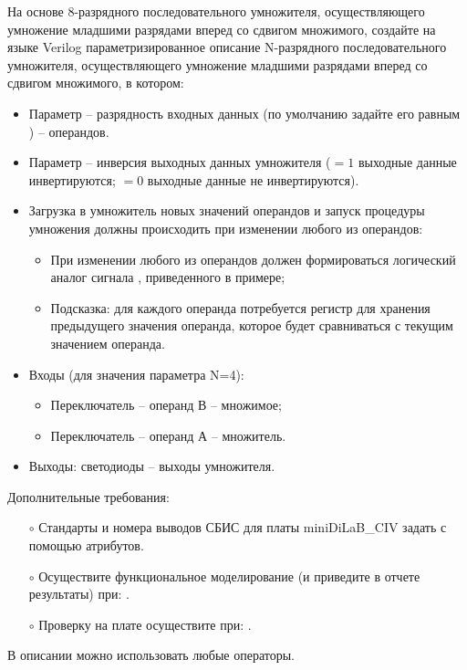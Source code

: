 На основе 8-разрядного последовательного умножителя, осуществляющего умножение младшими разрядами вперед со сдвигом множимого, создайте на языке Verilog параметризированное описание N-разрядного последовательного умножителя, осуществляющего умножение младшими разрядами вперед со сдвигом множимого, в котором:
\begin{itemize}
	\item Параметр  -- разрядность входных данных (по умолчанию задайте его равным ) -- операндов.
	\item Параметр  --  инверсия выходных данных умножителя ($=1$ выходные данные инвертируются; $=0$ выходные данные не инвертируются).
	\item Загрузка в умножитель новых значений операндов и запуск процедуры умножения должны происходить при изменении любого из операндов:
		\begin{itemize}
			\item При изменении любого из операндов должен формироваться логический аналог сигнала , приведенного в примере;
			\item Подсказка: для каждого операнда потребуется регистр для хранения предыдущего значения операнда, которое будет сравниваться с текущим значением операнда.		
		\end{itemize}
	\item Входы (для значения параметра N=4):
		\begin{itemize}
			\item Переключатель  -- операнд В -- множимое;
			\item Переключатель  -- операнд А -- множитель.
		\end{itemize}
	\item Выходы: светодиоды  -- выходы умножителя.
\end{itemize}

Дополнительные требования:
\begin{itemize}
	\item[$\circ$] Стандарты и номера выводов СБИС для платы miniDiLaB\_CIV задать с помощью атрибутов.
	\item[$\circ$] Осуществите функциональное моделирование (и приведите в отчете результаты) при: .
	\item[$\circ$] Проверку на плате осуществите при: .
\end{itemize}
В описании можно использовать любые операторы.

